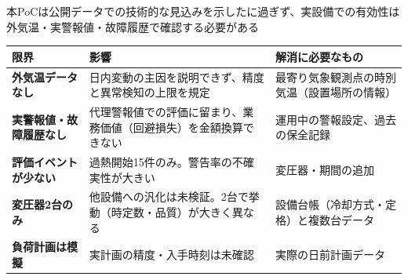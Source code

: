 \documentclass[aspectratio=169,10pt]{beamer}
\begin{document}
\begin{frame}{本PoCは公開データでの技術的な見込みを示したに過ぎず、実設備での有効性は外気温・実警報値・故障履歴で確認する必要がある}
  \footnotesize
  \renewcommand{\arraystretch}{1.35}
  \begin{tabularx}{\textwidth}{>{\bfseries}p{3.4cm} X X}
    \toprule
    限界 & 影響 & 解消に必要なもの \\
    \midrule
    外気温データなし & 日内変動の主因を説明できず、精度と異常検知の上限を規定 & 最寄り気象観測点の時別気温（設置場所の情報） \\
    実警報値・故障履歴なし & 代理警報値での評価に留まり、業務価値（回避損失）を金額換算できない & 運用中の警報設定、過去の保全記録 \\
    評価イベントが少ない & 過熱開始15件のみ。警告率の不確実性が大きい & 変圧器・期間の追加 \\
    変圧器2台のみ & 他設備への汎化は未検証。2台で挙動（時定数・品質）が大きく異なる & 設備台帳（冷却方式・定格）と複数台データ \\
    負荷計画は模擬 & 実計画の精度・入手時刻は未確認 & 実際の日前計画データ \\
    \bottomrule
  \end{tabularx}
\end{frame}
\end{document}
